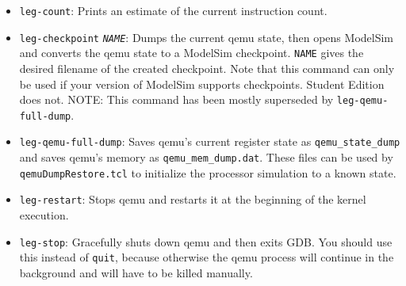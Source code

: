 \begin{itemize}
\item \texttt{leg-count}: Prints an estimate of the current instruction count.

\item \texttt{leg-checkpoint} \texttt{\emph{NAME}}: Dumps the current qemu state, then opens ModelSim and converts the qemu state to a ModelSim checkpoint. \texttt{NAME} gives the desired filename of the created checkpoint. Note that this command can only be used if your version of ModelSim supports checkpoints. Student Edition does not.
NOTE: This command has been mostly superseded by \texttt{leg-qemu-full-dump}.

\item \texttt{leg-qemu-full-dump}: Saves qemu's current register state as \texttt{qemu\_state\_dump} and saves qemu's memory as \texttt{qemu\_mem\_dump.dat}. These files can be used by \texttt{qemuDumpRestore.tcl} to initialize the processor simulation to a known state.

\item \texttt{leg-restart}: Stops qemu and restarts it at the beginning of the kernel execution.

\item \texttt{leg-stop}: Gracefully shuts down qemu and then exits GDB. You should use this instead of \texttt{quit}, because otherwise the qemu process will continue in the background and will have to be killed manually.
\end{itemize}